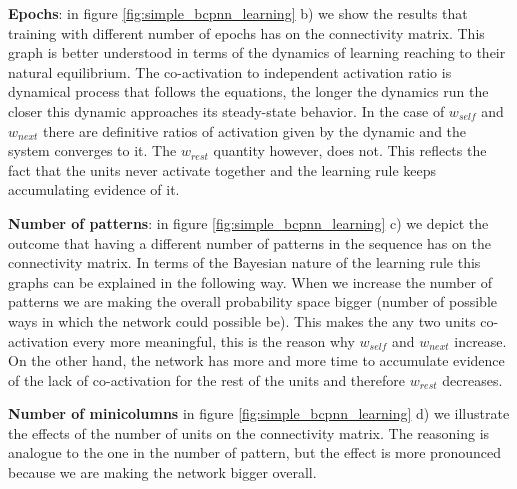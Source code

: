 \documentclass[10pt,a4paper]{article}
\begin{document}
\textbf{Epochs}: in figure \ref{fig:simple_bcpnn_learning} b) we show the results that training with different number of epochs has on the connectivity matrix. This graph is better understood in terms of the dynamics of learning reaching to their natural equilibrium. The co-activation to independent activation ratio is dynamical process that follows the equations, the longer the dynamics run the closer this dynamic approaches its steady-state behavior. In the case of $w_{self}$ and $w_{next}$ there are definitive ratios of activation given by the dynamic and the system converges to it. The $w_{rest}$ quantity however, does not. This reflects the fact that the units never activate together and the learning rule keeps accumulating evidence of it. 

\textbf{Number of patterns}: in figure \ref{fig:simple_bcpnn_learning} c) we depict the outcome that having a different number of patterns in the sequence has on the connectivity matrix. In terms of the Bayesian nature of the learning rule this graphs can be explained in the following way. When we increase the number of patterns we are making the overall probability space bigger (number of possible ways in which the network could possible be). This makes the any two units co-activation every more meaningful, this is the reason why $w_{self}$ and $w_{next}$ increase. On the other hand, the network has more and more time to accumulate evidence of the lack of co-activation for the rest of the units and therefore $w_{rest}$ decreases. 


\textbf{Number of minicolumns} in figure \ref{fig:simple_bcpnn_learning} d) we illustrate the effects of the number of units on the connectivity matrix. The reasoning is analogue to the one in the number of pattern, but the effect is more pronounced because we are making the network bigger overall. 
\end{document}
